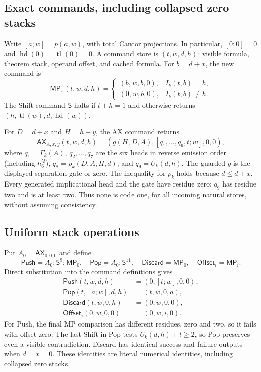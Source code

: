 \documentclass[11pt,letterpaper]{article}
\begin{document}
\subsection{Exact commands, including collapsed zero stacks}

Write $[a;w]=p(a,w)$, with total Cantor projections. In particular,
$[0;0]=0$ and $\operatorname{hd}(0)=\operatorname{tl}(0)=0$. A command store is
$(t,w,d,h)$: visible formula, theorem stack, operand offset, and cached formula.
For $b=d+x$, the new command is
\[
 \mathsf{MP}_x(t,w,d,h)=
 \begin{cases}(b,w,b,0),&I_k(t,b)=h,\\(0,w,b,0),&I_k(t,b)\ne h.\end{cases}
\]
The Shift command $\mathsf S$ halts if $t+h=1$ and otherwise returns
$(h,\operatorname{tl}(w),d,\operatorname{hd}(w))$.

For $D=d+x$ and $H=h+y$, the AX command returns
\[
 \mathsf{AX}_{A,x,y}(t,w,d,h)
   =(g(H,D,A),[q_1,\ldots,q_9,t;w],0,0),
\]
where $q_1=\Gamma_k(A)$, $q_2,\ldots,q_7$ are the six heads in reverse
emission order (including $h_6^Q$), $q_8=\rho_k(D,A,H,d)$,
and $q_9=U_k(d,h)$. The guarded $g$ is the displayed separation gate or zero.
The inequality for $\rho_k$ holds because $d\le d+x$. Every generated
implicational head and the gate have residue zero; $q_9$ has residue two and
is at least two. Thus none is code one, for all incoming natural stores,
without assuming consistency.

\subsection{Uniform stack operations}

Put $A_0=\mathsf{AX}_{0,0,0}$ and define
\[
 \mathsf{Push}=A_0;\mathsf S^9;\mathsf{MP}_0,
 \quad \mathsf{Pop}=A_0;\mathsf S^{11},
 \quad \mathsf{Discard}=\mathsf{MP}_0,
 \quad \mathsf{Offset}_i=\mathsf{MP}_i.
\]
Direct substitution into the command definitions gives
\begin{align*}
 \mathsf{Push}(t,w,d,h)&=(0,[t;w],0,0),\\
 \mathsf{Pop}(t,[a;w],d,h)&=(t,w,0,a),\\
 \mathsf{Discard}(t,w,0,h)&=(0,w,0,0),\\
 \mathsf{Offset}_i(0,w,0,0)&=(0,w,i,0).
\end{align*}
For Push, the final MP comparison has different residues, zero and two, so
it fails with offset zero. The last Shift in Pop tests $U_k(d,h)+t\ge2$,
so Pop preserves even a visible contradiction. Discard has identical success
and failure outputs when $d=x=0$. These identities are literal numerical
identities, including collapsed zero stacks.
\end{document}
